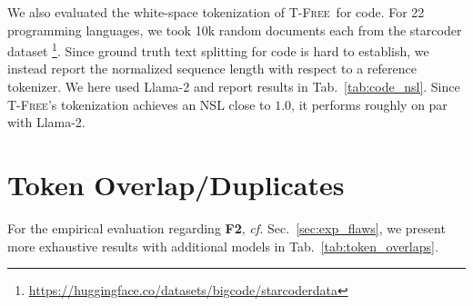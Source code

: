\documentclass[11pt]{article}
\newcommand{\method}{\textsc{T-Free}}
\begin{document}
We also evaluated the white-space tokenization of \method\ for code. For 22 programming languages, we took 10k random documents each from the starcoder dataset \footnote{\url{https://huggingface.co/datasets/bigcode/starcoderdata}}. Since ground truth text splitting for code is hard to establish, we instead report the normalized sequence length with respect to a reference tokenizer. We here used Llama-2 and report results in
Tab.~\ref{tab:code_nsl}. Since \method's tokenization achieves an NSL close to $1.0$, it performs roughly on par with Llama-2.
\section{Token Overlap/Duplicates}
For the empirical evaluation regarding \textbf{F2}, \emph{cf.} Sec.~\ref{sec:exp_flaws}, we present more exhaustive results with additional models in 
Tab.~\ref{tab:token_overlaps}.
 
\end{document}
